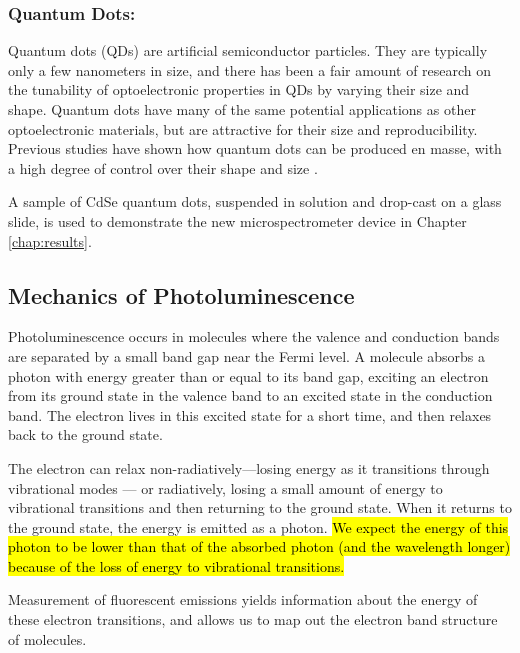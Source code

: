 \subsubsection{Quantum Dots: }\label{chap:intro-optomats-qd}

Quantum dots (QDs) are artificial semiconductor particles. They are typically only a few nanometers in size, and there has been a fair amount of research on the tunability of optoelectronic properties in QDs by varying their size and shape. Quantum dots have many of the same potential applications as other optoelectronic materials, but are attractive for their size and reproducibility. Previous studies have shown how quantum dots can be produced en masse, with a high degree of control over their shape and size \cite{empedocles_photoluminescence_1996, murray_synthesis_2000}.

A sample of CdSe quantum dots, suspended in solution and drop-cast on a glass slide, is used to demonstrate the new microspectrometer device in Chapter \ref{chap:results}.

\subsection{Mechanics of Photoluminescence}
Photoluminescence occurs in molecules where the valence and conduction bands are separated by a small band gap near the Fermi level. A molecule absorbs a photon with energy greater than or equal to its band gap, exciting an electron from its ground state in the valence band to an excited state in the conduction band. The electron lives in this excited state for a short time, and then relaxes back to the ground state.

The electron can relax non-radiatively---losing energy as it transitions through vibrational modes --- or radiatively, losing a small amount of energy to vibrational transitions and then returning to the ground state. When it returns to the ground state, the energy is emitted as a photon. \hl{We expect the energy of this photon to be lower than that of the absorbed photon (and the wavelength longer) because of the loss of energy to vibrational transitions.}


Measurement of fluorescent emissions yields information about the energy of these electron transitions, and allows us to map out the electron band structure of molecules.
